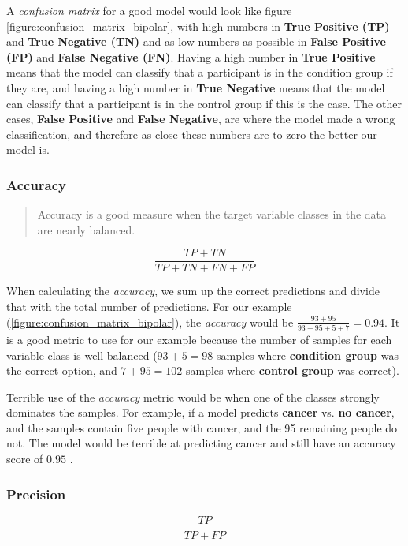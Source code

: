 A \textit{confusion matrix} for a good model would look like figure \ref{figure:confusion_matrix_bipolar}, with high numbers in \textbf{True Positive (TP)} and \textbf{True Negative (TN)} and as low numbers as possible in \textbf{False Positive (FP)} and \textbf{False Negative (FN)}. Having a high number in \textbf{True Positive} means that the model can classify that a participant is in the condition group if they are, and having a high number in \textbf{True Negative} means that the model can classify that a participant is in the control group if this is the case. The other cases, \textbf{False Positive} and \textbf{False Negative}, are where the model made a wrong classification, and therefore as close these numbers are to zero the better our model is.

\newpage

\subsubsection{Accuracy}

\blockquote[\cite{ml_metrics}]{Accuracy is a good measure when the target variable classes in the data are nearly balanced.}

\[ \frac{TP + TN}{TP + TN + FN + FP} \]

When calculating the \textit{accuracy}, we sum up the correct predictions and divide that with the total number of predictions. For our example (\ref{figure:confusion_matrix_bipolar}), the \textit{accuracy} would be $ \frac{93 + 95}{93 + 95 + 5 + 7} = 0.94 $. It is a good metric to use for our example because the number of samples for each variable class is well balanced ($ 93+5=98 $ samples where \textbf{condition group} was the correct option, and $ 7+95=102 $ samples where \textbf{control group} was correct).

Terrible use of the \textit{accuracy} metric would be when one of the classes strongly dominates the samples. For example, if a model predicts \textbf{cancer} vs. \textbf{no cancer}, and the samples contain five people with cancer, and the 95 remaining people do not. The model would be terrible at predicting cancer and still have an accuracy score of $ 0.95 $ \cite{ml_metrics}.

\newpage

\subsubsection{Precision} 

\[ \frac{TP}{TP + FP} \]

